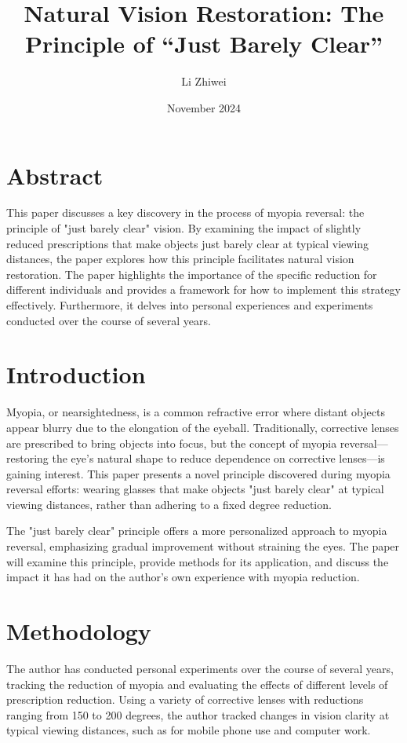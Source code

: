 \documentclass[12pt]{article}
\title{Natural Vision Restoration: The Principle of ``Just Barely Clear''}
\author{Li Zhiwei}
\date{November 2024}
\begin{document}
\maketitle

\section*{Abstract}
This paper discusses a key discovery in the process of myopia reversal: the principle of "just barely clear" vision. By examining the impact of slightly reduced prescriptions that make objects just barely clear at typical viewing distances, the paper explores how this principle facilitates natural vision restoration. The paper highlights the importance of the specific reduction for different individuals and provides a framework for how to implement this strategy effectively. Furthermore, it delves into personal experiences and experiments conducted over the course of several years.

\section{Introduction}
Myopia, or nearsightedness, is a common refractive error where distant objects appear blurry due to the elongation of the eyeball. Traditionally, corrective lenses are prescribed to bring objects into focus, but the concept of myopia reversal—restoring the eye’s natural shape to reduce dependence on corrective lenses—is gaining interest. This paper presents a novel principle discovered during myopia reversal efforts: wearing glasses that make objects "just barely clear" at typical viewing distances, rather than adhering to a fixed degree reduction.

The "just barely clear" principle offers a more personalized approach to myopia reversal, emphasizing gradual improvement without straining the eyes. The paper will examine this principle, provide methods for its application, and discuss the impact it has had on the author’s own experience with myopia reduction.

\section{Methodology}
The author has conducted personal experiments over the course of several years, tracking the reduction of myopia and evaluating the effects of different levels of prescription reduction. Using a variety of corrective lenses with reductions ranging from 150 to 200 degrees, the author tracked changes in vision clarity at typical viewing distances, such as for mobile phone use and computer work.
\end{document}
